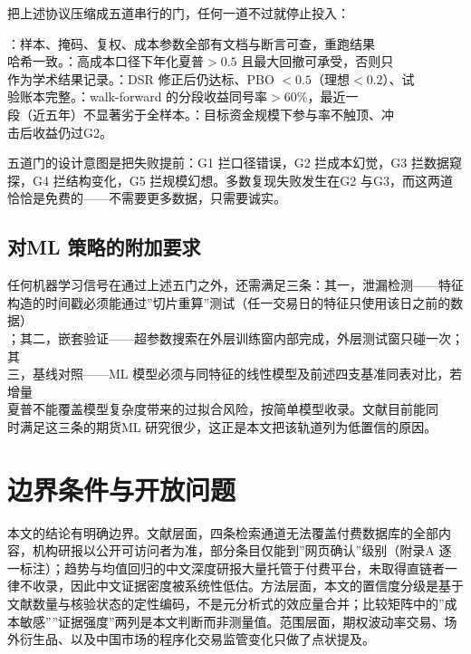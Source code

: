 \documentclass[12pt,a4paper]{ctexart}
\begin{document}
把上述协议压缩成五道串行的门，任何一道不过就停止投入：


：样本、掩码、复权、成本参数全部有文档与断言可查，重跑结果\\哈希一致。：高成本口径下年化夏普$> 0.5$ 且最大回撤可承受，否则只\\作为学术结果记录。：DSR 修正后仍达标、PBO $< 0.5$（理想$< 0.2$）、试\\验账本完整\cite{86, 87}。：walk-forward 的分段收益同号率$> 60$\%，最近一\\段（近五年）不显著劣于全样本。：目标资金规模下参与率不触顶、冲\\击后收益仍过G2。


五道门的设计意图是把失败提前：G1 拦口径错误，G2 拦成本幻觉，G3 拦数据窥探，G4 拦结构变化，G5 拦规模幻想。多数复现失败发生在G2 与G3，而这两道恰恰是免费的——不需要更多数据，只需要诚实。


\subsection{对ML 策略的附加要求}

任何机器学习信号在通过上述五门之外，还需满足三条：其一，泄漏检测——特征\\构造的时间戳必须能通过”\kern-9pt\hspace{0.3em}切片重算”\kern-9pt\hspace{0.3em}测试\kern-7pt（任一交易日的特征只使用该日之前的数据）\kern-6pt\\\cite{82}；其二，嵌套验证——超参数搜索在外层训练窗内部完成，外层测试窗只碰一次；其\\三，基线对照——ML 模型必须与同特征的线性模型及前述四支基准同表对比，若增量\\夏普不能覆盖模型复杂度带来的过拟合风险，按简单模型收录\cite{36, 82}。文献目前能同\\时满足这三条的期货ML 研究很少\cite{78, 81}，这正是本文把该轨道列为低置信的原因。


\section{边界条件与开放问题}

本文的结论有明确边界。文献层面，四条检索通道无法覆盖付费数据库的全部内容，机构研报以公开可访问者为准，部分条目仅能到”\hspace{0.3em}网页确认”\hspace{0.3em}级别（附录A 逐一标注）；趋势与均值回归的中文深度研报大量托管于付费平台，未取得直链者一律不收录，因此中文证据密度被系统性低估。方法层面，本文的置信度分级是基于文献数量与核验状态的定性编码，不是元分析式的效应量合并；比较矩阵中的”\hspace{0.3em}成本敏感””\hspace{0.3em}证据强度”\hspace{0.3em}两列是本文判断而非测量值。范围层面，期权波动率交易、场外衍生品、以及中国市场的程序化交易监管变化只做了点状提及。
\end{document}
